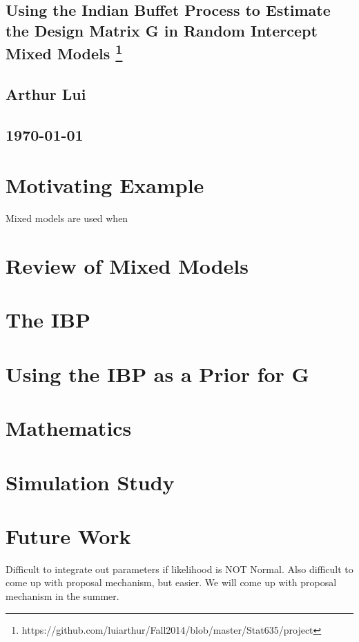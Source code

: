 \documentclass{article}
\begin{document}
\begin{center}
  \section*{\textbf{Using the Indian Buffet Process to Estimate the Design Matrix G in Random Intercept Mixed Models}
    \footnote{https://github.com/luiarthur/Fall2014/blob/master/Stat635/project}
  }
  \subsection*{\textbf{Arthur Lui}}
  \subsection*{\noindent\today}
\end{center}

\section*{Motivating Example}
Mixed models are used when 

\section*{Review of Mixed Models}
\section*{The IBP}
\section*{Using the IBP as a Prior for G}
\section*{Mathematics}
\section*{Simulation Study}
\section*{Future Work}
Difficult to integrate out parameters if likelihood is NOT Normal.
Also difficult to come up with proposal mechanism, but easier. 
We will come up with proposal mechanism in the summer.
\end{document}
